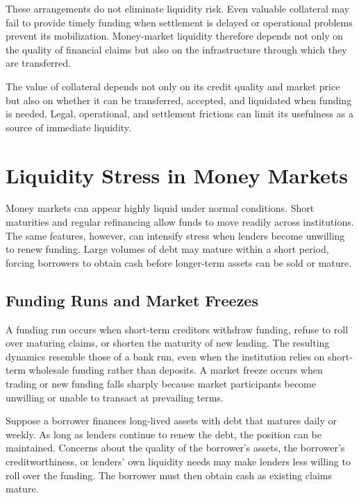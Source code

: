 These arrangements do not eliminate liquidity risk.
Even valuable collateral may fail to provide timely
funding when settlement is delayed or operational
problems prevent its mobilization. Money-market
liquidity therefore depends not only on the quality
of financial claims but also on the infrastructure
through which they are transferred.
\begin{tcolorbox}[
  enhanced,
  breakable,
  colback=white,
  colframe=FinanceBlue,
  boxrule=0.7pt,
  sharp corners,
  borderline west={2.2pt}{0pt}{FinanceBlue},
  title=\textbf{Financial Perspective: Collateral Must Be Mobilizable},
  coltitle=white,
  colbacktitle=FinanceBlue,
  fonttitle=\bfseries,
  before skip=1.2em,
  after skip=1.2em
]

The value of collateral depends not only on its
credit quality and market price but also on whether
it can be transferred, accepted, and liquidated
when funding is needed. Legal, operational, and
settlement frictions can limit its usefulness as
a source of immediate liquidity.

\end{tcolorbox}

\section{Liquidity Stress in Money Markets}

Money markets can appear highly liquid under normal conditions. Short maturities and regular refinancing allow funds to move readily across institutions. The same features, however, can intensify stress when lenders become unwilling to renew funding. Large volumes of debt may mature within a short period, forcing borrowers to obtain cash before longer-term assets can be sold or mature.

\subsection{Funding Runs and Market Freezes}

A funding run occurs when short-term creditors withdraw
funding, refuse to roll over maturing claims, or shorten
the maturity of new lending. The resulting dynamics
resemble those of a bank run, even when the institution
relies on short-term wholesale funding rather than
deposits. A market freeze occurs when trading or new funding
falls sharply because market participants become
unwilling or unable to transact at prevailing terms.

Suppose a borrower finances long-lived assets with debt
that matures daily or weekly. As long as lenders continue
to renew the debt, the position can be maintained.
Concerns about the quality of the borrower's assets,
the borrower's creditworthiness, or lenders' own
liquidity needs may make lenders less willing to
roll over the funding. The borrower must then obtain cash
as existing claims mature.

